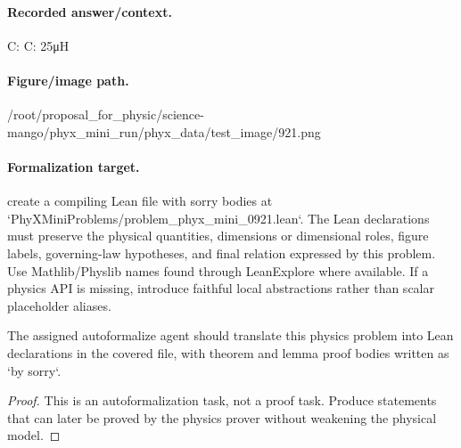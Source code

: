 \paragraph{Recorded answer/context.}
C: C: 25μH

\paragraph{Figure/image path.}
/root/proposal\_for\_physic/science-mango/phyx\_mini\_run/phyx\_data/test\_image/921.png

\paragraph{Formalization target.}
create a compiling Lean file with sorry bodies at `PhyXMiniProblems/problem\_phyx\_mini\_0921.lean`. The Lean declarations must preserve the physical quantities, dimensions or dimensional roles, figure labels, governing-law hypotheses, and final relation expressed by this problem.
Use Mathlib/Physlib names found through LeanExplore where available. If a physics API is missing, introduce faithful local abstractions rather than scalar placeholder aliases.

\begin{theorem}
\label{thm:physics:phyx_mini_0921:target}
The assigned autoformalize agent should translate this physics problem into Lean declarations in the covered file, with theorem and lemma proof bodies written as `by sorry`.
\end{theorem}
\begin{proof}
This is an autoformalization task, not a proof task. Produce statements that can later be proved by the physics prover without weakening the physical model.
\end{proof}

